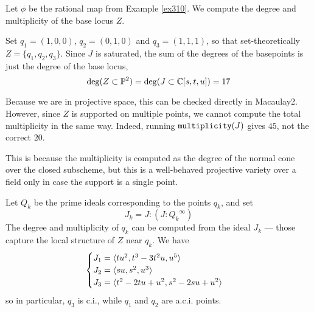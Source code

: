\documentclass[fleqn,reqno]{amsart}
\begin{document}
\begin{example}[$\mt{ex311}$]
\label{ex311}
Let $\phi$ be the rational map from Example \ref{ex310}.
We compute the degree and multiplicity of the base locus $Z$.

Set $q_1=(1,0,0)$, $q_2=(0,1,0)$ and $q_3=(1,1,1)$, so that set-theoretically $Z=\{q_1,q_2,q_3\}$.
Since $J$ is saturated,
the sum of the degrees of the basepoints is just the degree of the base locus,
\[
	\deg(Z\subset\mathbb{P}^2)=\deg(J\subset\mathbb{C}[s,t,u])=17
\]

Because we are in projective space, this can be checked directly in Macaulay2.
However, since $Z$ is supported on multiple points,
we cannot compute the total multiplicity in the same way.
Indeed, running $\mathop{\tt multiplicity}(J)$ gives $45$, not the correct $20$.

This is because the multiplicity is computed as the degree of the normal cone
over the closed subscheme,
but this is a well-behaved projective variety over a field only in case
the support is a single point.

Let $Q_k$ be the prime ideals corresponding to the points $q_k$, and set
\[
	J_k=J:(J:{Q_k}^\infty)
\]
The degree and multiplicity of $q_k$ can be computed from the ideal $J_k$ ---
those capture the local structure of $Z$ near $q_k$.
We have
\[
	\begin{cases}
	J_1=\langle t u^{2},t^{3}-3 t^{2} u,u^{5}\rangle\\
	J_2=\langle s u,s^{2},u^{3}\rangle\\
	J_3=\langle t^{2}-2 t u+u^{2},s^{2}-2 s u+u^{2}\rangle
	\end{cases}
\]
so in particular, $q_3$ is c.i., while $q_1$ and $q_2$ are a.c.i. points.
\end{example}
\end{document}
